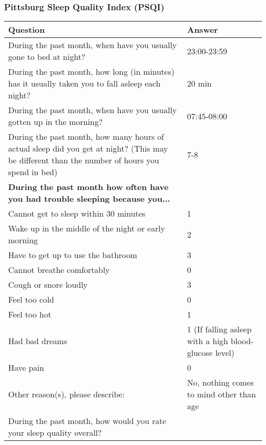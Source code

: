\subsubsection{Pittsburg Sleep Quality Index (PSQI)}
\begin{table}[H]
    \centering
    \renewcommand{\arraystretch}{1.2}
    \begin{tabularx}{\textwidth}{|X|l|}
        \hline
        \textbf{Question} & \textbf{Answer} \\ \hline
        During the past month, when have you usually gone to bed at night? &
        23:00-23:59
        \\ \hline
        During the past month, how long (in minutes) has it usually taken you to fall asleep each night? &
        20 min
        \\ \hline
        During the past month, when have you usually gotten up in the morning? &
        07:45-08:00
        \\ \hline
        During the past month, how many hours of actual sleep did you get at night? (This may be different than the number of hours you spend in bed) &
        7-8 
        \\ \hline
        \textbf{During the past month how often have you had trouble sleeping because you...} & \\ \hline
        \quad Cannot get to sleep within 30 minutes &
        1
        \\ \hline
        \quad Wake up in the middle of the night or early morning &
        2 
        \\ \hline
        \quad Have to get up to use the bathroom & 
        3 
        \\ \hline
        \quad Cannot breathe comfortably & 
        0 
        \\ \hline
        \quad Cough or snore loudly & 
        3 
        \\ \hline
        \quad Feel too cold & 
        0 
        \\ \hline
        \quad Feel too hot & 
        1 
        \\ \hline
        \quad Had bad dreams & 
        1 (If falling asleep with a high blood-glucose level) 
        \\ \hline
        \quad Have pain & 
        0 
        \\ \hline
        \quad Other reason(s), please describe: & 
        No, nothing comes to mind other than age 
        \\ \hline
        During the past month, how would you rate your sleep quality overall? & 

\end{tabularx}
\end{table}
